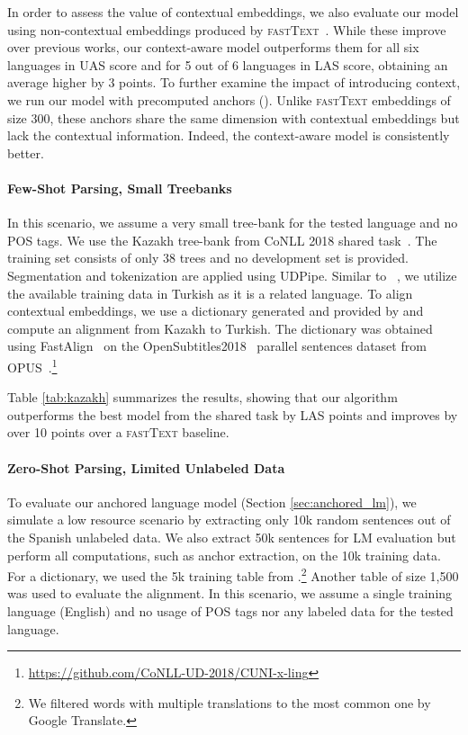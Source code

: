 \documentclass[11pt,a4paper]{article}
\newcommand{\secref}[1]{Section \ref{#1}}
\newcommand{\tabref}[1]{Table \ref{#1}}
\begin{document}
In order to assess the value of contextual embeddings, we also evaluate our model using non-contextual embeddings produced by \textsc{fastText}~\cite{bojanowski_enriching_2017}. While these improve over previous works, our context-aware model outperforms them for all six languages in UAS score and for 5 out of 6 languages in LAS score, obtaining an average higher by 3 points. To further examine the impact of introducing context, we run our model with precomputed anchors (). Unlike \textsc{fastText} embeddings of size 300, these anchors share the same dimension with contextual embeddings but lack the contextual information. Indeed, the context-aware model is consistently better.


\paragraph{Few-Shot Parsing, Small Treebanks} 
In this scenario, we assume a very small tree-bank for the tested language and no POS tags. We use the Kazakh tree-bank from CoNLL 2018 shared task~\cite{zeman-EtAl:2018:K18-2}. The training set consists of only 38 trees and no development set is provided. Segmentation and tokenization are applied using UDPipe. Similar to ~\citet{rosa_cuni_2018, smith201882}, we utilize the available training data in Turkish as it is a related language. To align contextual embeddings, we use a dictionary generated and provided by \citet{rosa_cuni_2018} and compute an alignment from Kazakh to Turkish.
The dictionary was obtained using FastAlign~\cite{fastalign} on the OpenSubtitles2018~\cite{opensub} parallel sentences dataset from OPUS~\cite{opus}.\footnote{\url{https://github.com/CoNLL-UD-2018/CUNI-x-ling}}

\tabref{tab:kazakh} summarizes the results, showing that our algorithm outperforms the best model from the shared task by  LAS points and improves by over 10 points over a \textsc{fastText} baseline.

\paragraph{Zero-Shot Parsing, Limited Unlabeled Data}
To evaluate our anchored language model (\secref{sec:anchored_lm}), we simulate a low resource scenario by extracting only 10k random sentences out of the Spanish unlabeled data. We also extract 50k sentences for LM evaluation but perform all computations, such as anchor extraction, on the 10k training data. For a dictionary, we used the 5k training table from \citet{conneau2017word}.\footnote{We filtered words with multiple translations to the most common one by Google Translate.} Another table of size 1,500 was used to evaluate the alignment. In this scenario, we assume a single training language (English) and no usage of POS tags nor any labeled data for the tested language.
\end{document}
